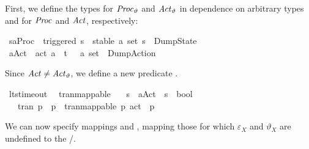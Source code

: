 \begin{isabellebody}
\begin{isamarkuptext}
First, we define the types for $\mathit{Proc}_\vartheta$ and $\mathit{Act}_\vartheta$ in dependence on arbitrary types  and  for $\mathit{Proc}$ and $\mathit{Act}$, respectively:%
\end{isamarkuptext}\isamarkuptrue%
\isamarkupfalse%
\ {\isacharparenleft}{\kern0pt}{\isacharprime}{\kern0pt}s{\isacharcomma}{\kern0pt}{\isacharprime}{\kern0pt}a{\isacharparenright}{\kern0pt}Proc{\isacharunderscore}{\kern0pt}{\isasymtheta}\ {\isacharequal}{\kern0pt}\ triggered\ {\isacharprime}{\kern0pt}s\ {\isacharbar}{\kern0pt}\ stable\ {\isacartoucheopen}{\isacharprime}{\kern0pt}a\ set{\isacartoucheclose}\ {\isacharprime}{\kern0pt}s\ {\isacharbar}{\kern0pt}\ DumpState\isanewline
{}\isamarkupfalse%
\ {\isacharparenleft}{\kern0pt}{\isacharprime}{\kern0pt}a{\isacharparenright}{\kern0pt}Act{\isacharunderscore}{\kern0pt}{\isasymtheta}\ {\isacharequal}{\kern0pt}\ act\ {\isacharprime}{\kern0pt}a\ {\isacharbar}{\kern0pt}\ t{\isacharunderscore}{\kern0pt}{\isasymepsilon}\ {\isacharbar}{\kern0pt}\ {\isasymepsilon}\ {\isacartoucheopen}{\isacharprime}{\kern0pt}a\ set{\isacartoucheclose}\ {\isacharbar}{\kern0pt}\ DumpAction%
\begin{isamarkuptext}%
Since $\mathit{Act} \neq \mathit{Act}_\vartheta$, we define a new predicate .%
\end{isamarkuptext}\isamarkuptrue%
\isamarkupfalse%
\ lts{\isacharunderscore}{\kern0pt}timeout\ \isanewline
\isanewline
{}\isamarkupfalse%
\ tran{\isacharunderscore}{\kern0pt}mappable\isanewline
\ \ {\isacharcolon}{\kern0pt}{\isacharcolon}{\kern0pt}\ {\isacartoucheopen}{\isacharprime}{\kern0pt}s\ {\isasymRightarrow}\ {\isacharparenleft}{\kern0pt}{\isacharprime}{\kern0pt}a{\isacharparenright}{\kern0pt}Act{\isacharunderscore}{\kern0pt}{\isasymtheta}\ {\isasymRightarrow}\ {\isacharprime}{\kern0pt}s\ {\isasymRightarrow}\ bool{\isacartoucheclose}\ \isanewline
\ \ \ {\isacartoucheopen}tran\ p\ {\isasymalpha}\ p{\isacharprime}{\kern0pt}\ {\isasymLongrightarrow}\ tran{\isacharunderscore}{\kern0pt}mappable\ p\ {\isacharparenleft}{\kern0pt}act\ {\isasymalpha}{\isacharparenright}{\kern0pt}\ p{\isacharprime}{\kern0pt}{\isacartoucheclose}%
\begin{isamarkuptext}%
We can now specify mappings  and , mapping those  for which $\varepsilon_X$ and $\vartheta_X$ are undefined to the /.%

\end{isamarkuptext}
\end{isabellebody}
